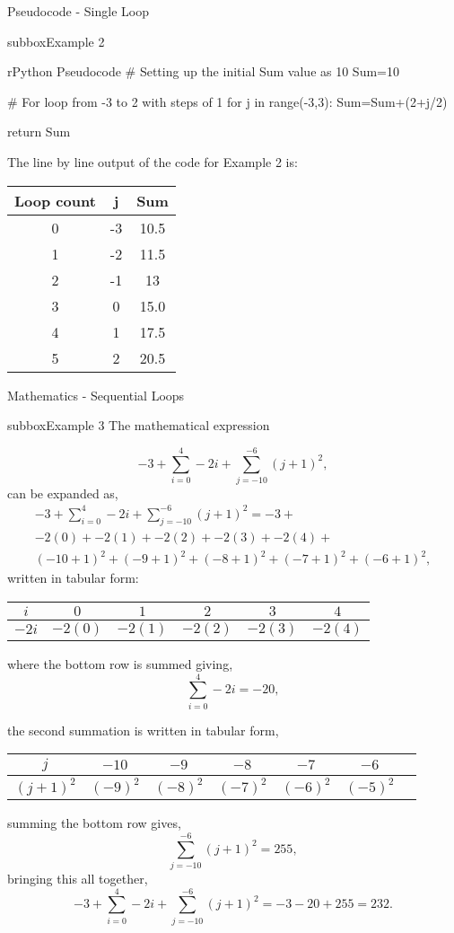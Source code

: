 \documentclass[10pt,a4paper]{article}
\begin{document}
\begin{multicols}{3}
\begin{textbox}{Pseudocode - Single Loop}
\begin{subbox}{subbox}{Example 2}
\begin{codebox}{r}{Python Pseudocode}
# Setting up the initial Sum value as 10
Sum=10

# For loop from -3 to 2 with steps of 1
for j in range(-3,3):
    Sum=Sum+(2+j/2)

return Sum
\end{codebox}
The line by line output of the code for Example 2 is:
\begin{center}
\begin{tabular}{ c| c| c }
 Loop count &j & Sum \\ \hline
 0&-3 & 10.5  \\
 1&-2 & 11.5  \\
 2&-1 & 13  \\
 3&0 & 15.0  \\
 4&1 & 17.5  \\
 5&2 & 20.5 
\end{tabular}
\end{center}
\end{subbox}
\end{textbox}
\begin{textbox}{Mathematics - Sequential Loops}

\begin{subbox}{subbox}{Example 3}
The mathematical expression

\[ -3+\sum_{i=0}^{4} -2i+\sum_{j=-10}^{-6} (j+1)^2, \]
can be expanded as,
\begin{multline*}
-3+\sum_{i=0}^{4} -2i+\sum_{j=-10}^{-6} (j+1)^2=-3+\\-2(0)+-2(1)+-2(2)+-2(3)+-2(4)+\\
(-10+1)^2+(-9+1)^2+(-8+1)^2+(-7+1)^2+(-6+1)^2,
\end{multline*}
written in tabular form:\\
\begin{tabular}{ c| c c c c c }
 $i$&$0$ & $1$ & $2$&$3$ & $4$  \\ \hline
 $-2i$&$-2(0)$ & $-2(1)$ & $-2(2)$&$-2(3)$ & $-2(4)$ 
\end{tabular}
where the bottom row is summed giving,
\[ \sum_{i=0}^{4} -2i=-20,\]

the second summation is written in tabular form,\\
\begin{tabular}{ c| c c c c c c }
 $j$&$-10$ & $-9$ & $-8$&$-7$ & $-6$ \\ \hline
 $ (j+1)^2$&$ (-9)^2$ & $(-8)^2$ & $(-7)^2$&$(-6)^2$ & $(-5)^2$
\end{tabular}
summing the bottom row gives,
\[ \sum_{j=-10}^{-6} (j+1)^2=255,\]
bringing this all together,
\[ -3+\sum_{i=0}^{4} -2i+\sum_{j=-10}^{-6} (j+1)^2=-3-20+255=232. \]


\end{subbox}
\end{textbox}
\end{multicols}
\end{document}
